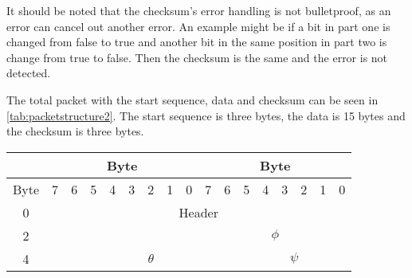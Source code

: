 It should be noted that the checksum's error handling is not bulletproof, as an error can cancel out another error. An example might be if a bit in part one is changed from false to true and another bit in the same position in part two is change from true to false. Then the checksum is the same and the error is not detected. 

The total packet with the start sequence, data and checksum can be seen in \autoref{tab:packetstructure2}. The start sequence is three bytes, the data is 15 bytes and the checksum is three bytes.
\begin{table}[H]
	\centering
	\begin{tabular}{lclllllllllllllll}
		\hline
		\multicolumn{1}{|c|}{}& \multicolumn{8}{c|}{Byte}                                                                                                                                                                           & \multicolumn{8}{c|}{Byte}                                                                                                                                                                                 \\ \hline
		\multicolumn{1}{|l|}{Byte} & \multicolumn{1}{c|}{7} & \multicolumn{1}{c|}{6} & \multicolumn{1}{c|}{5} & \multicolumn{1}{c|}{4} & \multicolumn{1}{c|}{3} & \multicolumn{1}{c|}{2} & \multicolumn{1}{c|}{1} & \multicolumn{1}{c|}{0} & \multicolumn{1}{|c|}{7} & \multicolumn{1}{c|}{6} & \multicolumn{1}{c|}{5} & \multicolumn{1}{c|}{4} & \multicolumn{1}{c|}{3} & \multicolumn{1}{c|}{2} & \multicolumn{1}{c|}{1} & \multicolumn{1}{c|}{0} \\ \hline
		\multicolumn{1}{|c|}{0}  & \multicolumn{16}{c|}{Header}                           \\ \hline
		\multicolumn{1}{|c|}{2}      & \multicolumn{8}{c|}{}                                                                                                                                                                                 & \multicolumn{8}{c|}{$\phi$}                                                                                                                                                                                 \\ \hline
		\multicolumn{1}{|c|}{4}    & \multicolumn{1}{c|}{}  & \multicolumn{9}{c|}{$\theta$}                         & \multicolumn{6}{c|}{$\psi$}                                                                                                                               \\ \hline

\end{tabular}
\end{table}
